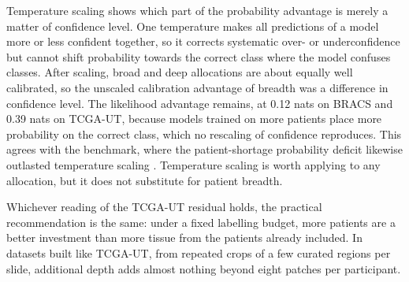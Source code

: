 Temperature scaling shows which part of the probability advantage is merely a matter of confidence level. One temperature makes all predictions of a model more or less confident together, so it corrects systematic over- or underconfidence but cannot shift probability towards the correct class where the model confuses classes. After scaling, broad and deep allocations are about equally well calibrated, so the unscaled calibration advantage of breadth was a difference in confidence level. The likelihood advantage remains, at 0.12 nats on BRACS and 0.39 nats on TCGA-UT, because models trained on more patients place more probability on the correct class, which no rescaling of confidence reproduces. This agrees with the benchmark, where the patient-shortage probability deficit likewise outlasted temperature scaling \citep{queisler2026benchmarkResults}. Temperature scaling is worth applying to any allocation, but it does not substitute for patient breadth.

Whichever reading of the TCGA-UT residual holds, the practical recommendation is the same: under a fixed labelling budget, more patients are a better investment than more tissue from the patients already included. In datasets built like TCGA-UT, from repeated crops of a few curated regions per slide, additional depth adds almost nothing beyond eight patches per participant.

